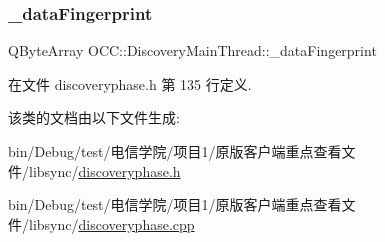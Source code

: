 \subsubsection{\texorpdfstring{\+\_\+data\+Fingerprint}{\_dataFingerprint}}
{\footnotesize\ttfamily Q\+Byte\+Array O\+C\+C\+::\+Discovery\+Main\+Thread\+::\+\_\+data\+Fingerprint}



在文件 discoveryphase.\+h 第 135 行定义.



该类的文档由以下文件生成\+:\begin{DoxyCompactItemize}
\item 
bin/\+Debug/test/电信学院/项目1/原版客户端重点查看文件/libsync/\hyperlink{discoveryphase_8h}{discoveryphase.\+h}\item 
bin/\+Debug/test/电信学院/项目1/原版客户端重点查看文件/libsync/\hyperlink{discoveryphase_8cpp}{discoveryphase.\+cpp}\end{DoxyCompactItemize}
